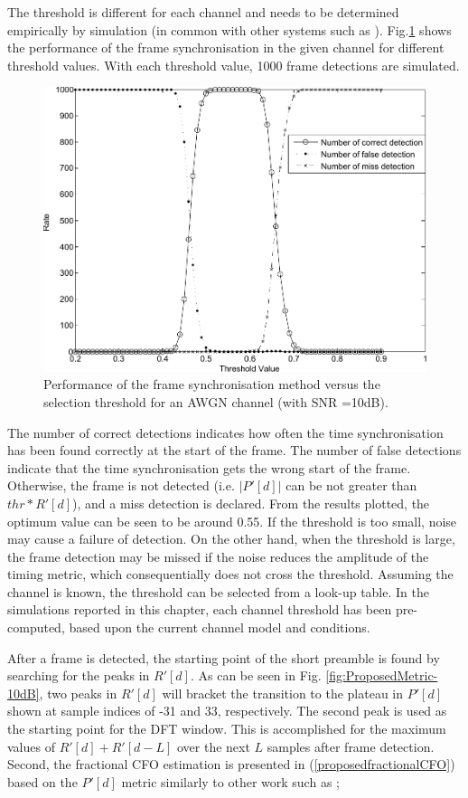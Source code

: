 The threshold is different for each channel and needs to be determined empirically by simulation (in common with other systems such as \cite{Kishore2006}).
Fig.\ref{fig:TimeSyn_thr_AWGN} shows the performance of the frame synchronisation in the given channel for different threshold values.
With each threshold value, 1000 frame detections are simulated. 
\begin{figure}
	\centerline{\includegraphics [width=1\columnwidth] {figures/ThresholdEffect.pdf}}
	\caption{Performance of the frame synchronisation method versus the selection threshold for an AWGN channel (with SNR =10dB).}
	\label{fig:TimeSyn_thr_AWGN}
\end{figure}
The number of correct detections indicates how often the time synchronisation has been found correctly at the start of the frame.
The number of false detections indicate that the time synchronisation gets the wrong start of the frame.
Otherwise, the frame is not detected (i.e. $|P'[d]|$ can be not greater than $thr * R'[d]$), and a miss detection is declared. 
From the results plotted,  the optimum value can be seen to be around 0.55. 
If the threshold is too small, noise may cause a failure of detection.
On the other hand, when the threshold is large, the frame detection may be missed if the noise reduces the amplitude of the timing metric, which consequentially does not cross the threshold. 
Assuming the channel is known, the threshold can be selected from a look-up table. In the simulations reported in this chapter, each channel threshold has been pre-computed, based upon the current channel model and conditions.

After a frame is detected, the starting point of the short preamble is found by searching for the peaks in $R'[d]$.
As can be seen in Fig. \ref{fig:ProposedMetric-10dB}, two peaks in $R'[d]$ will bracket the transition to the plateau in $P'[d]$ shown at sample indices of -31 and 33, respectively. 
The second peak is used as the starting point for the DFT window. 
This is accomplished for the maximum values of $R'[d] + R'[d - L]$ over the next $L$ samples after frame detection.
Second, the fractional CFO estimation is presented in (\ref{proposedfractionalCFO}) based on the $P'[d]$ metric similarly to other work such as \cite{Schmidl1997,Schwoerer2002,Manavi2004,Guffey2007,Huang2010,Recio2010};

